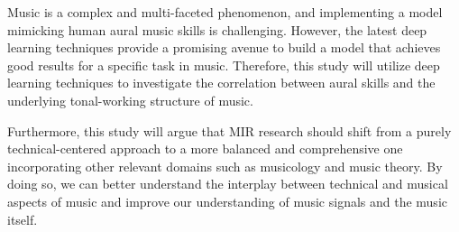 Music is a complex and multi-faceted phenomenon, and implementing a model mimicking human aural music skills is challenging. However, the latest deep learning techniques provide a promising avenue to build a model that achieves good results for a specific task in music. Therefore, this study will utilize deep learning techniques to investigate the correlation between aural skills and the underlying tonal-working structure of music.

Furthermore, this study will argue that MIR research should shift from a purely technical-centered approach to a more balanced and comprehensive one incorporating other relevant domains such as musicology and music theory. By doing so, we can better understand the interplay between technical and musical aspects of music and improve our understanding of music signals and the music itself.


